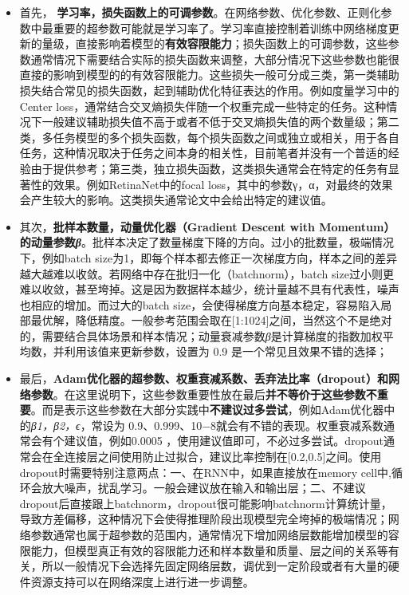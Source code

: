 \begin{itemize}
\item
  首先，
  \textbf{学习率，损失函数上的可调参数}。在网络参数、优化参数、正则化参数中最重要的超参数可能就是学习率了。学习率直接控制着训练中网络梯度更新的量级，直接影响着模型的\textbf{有效容限能力}；损失函数上的可调参数，这些参数通常情况下需要结合实际的损失函数来调整，大部分情况下这些参数也能很直接的影响到模型的的有效容限能力。这些损失一般可分成三类，第一类辅助损失结合常见的损失函数，起到辅助优化特征表达的作用。例如度量学习中的Center
  loss，通常结合交叉熵损失伴随一个权重完成一些特定的任务。这种情况下一般建议辅助损失值不高于或者不低于交叉熵损失值的两个数量级；第二类，多任务模型的多个损失函数，每个损失函数之间或独立或相关，用于各自任务，这种情况取决于任务之间本身的相关性，目前笔者并没有一个普适的经验由于提供参考；第三类，独立损失函数，这类损失通常会在特定的任务有显著性的效果。例如RetinaNet中的focal
  loss，其中的参数γ，α，对最终的效果会产生较大的影响。这类损失通常论文中会给出特定的建议值。
\item
  其次，\textbf{批样本数量，动量优化器（Gradient Descent with
  Momentum）的动量参数\emph{β}}。批样本决定了数量梯度下降的方向。过小的批数量，极端情况下，例如batch
  size为1，即每个样本都去修正一次梯度方向，样本之间的差异越大越难以收敛。若网络中存在批归一化（batchnorm），batch
  size过小则更难以收敛，甚至垮掉。这是因为数据样本越少，统计量越不具有代表性，噪声也相应的增加。而过大的batch
  size，会使得梯度方向基本稳定，容易陷入局部最优解，降低精度。一般参考范围会取在{[}1:1024{]}之间，当然这个不是绝对的，需要结合具体场景和样本情况；动量衰减参数\emph{β}是计算梯度的指数加权平均数，并利用该值来更新参数，设置为
  0.9 是一个常见且效果不错的选择；
\item
  最后，\textbf{Adam优化器的超参数、权重衰减系数、丢弃法比率（dropout）和网络参数}。在这里说明下，这些参数重要性放在最后\textbf{并不等价于这些参数不重要}。而是表示这些参数在大部分实践中\textbf{不建议过多尝试}，例如Adam优化器中的\emph{β1，β2，ϵ}，常设为
  0.9、0.999、10−8就会有不错的表现。权重衰减系数通常会有个建议值，例如0.0005
  ，使用建议值即可，不必过多尝试。dropout通常会在全连接层之间使用防止过拟合，建议比率控制在{[}0.2,0.5{]}之间。使用dropout时需要特别注意两点：一、在RNN中，如果直接放在memory
  cell中,循环会放大噪声，扰乱学习。一般会建议放在输入和输出层；二、不建议dropout后直接跟上batchnorm，dropout很可能影响batchnorm计算统计量，导致方差偏移，这种情况下会使得推理阶段出现模型完全垮掉的极端情况；网络参数通常也属于超参数的范围内，通常情况下增加网络层数能增加模型的容限能力，但模型真正有效的容限能力还和样本数量和质量、层之间的关系等有关，所以一般情况下会选择先固定网络层数，调优到一定阶段或者有大量的硬件资源支持可以在网络深度上进行进一步调整。
\end{itemize}

